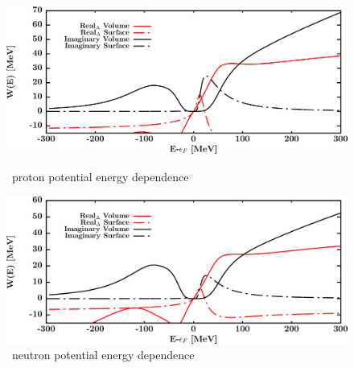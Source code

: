 \begin{figure}[hbtp]
    \centering
    \begin{minipage}{0.42\textwidth}
        \centering
        \includegraphics[width=\textwidth]{figures/pb208_protonPotentials.png}
        \caption*{\footnotesize\pbEight\ proton potential energy dependence}
        \label{DOMFitData_pb208_proton_potentialComponent_energy}
    \end{minipage}\hspace{6pt}
    \begin{minipage}{0.42\textwidth}
        \centering
        \includegraphics[width=\textwidth]{figures/pb208_neutronPotentials.png}
        \caption*{\footnotesize\pbEight\ neutron potential energy dependence}
        \label{DOMFitData_pb208_neutron_potentialComponent_energy}
    \end{minipage}
\end{figure}
